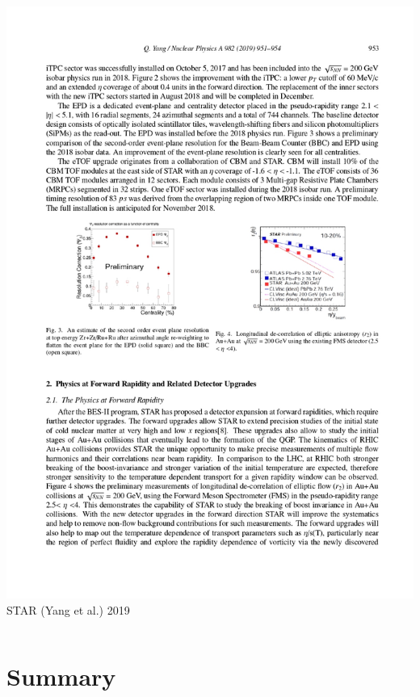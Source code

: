 \documentclass[accentcolor=tud2c,usenames,dvipsnames,colorbacktitle,inverttitle,landscape,german,presentation,t]{tudbeamer}
\begin{document}
\begin{frame}
\begin{columns}[c]
\begin{column}{0.4\textwidth}
\begin{center}
          \includegraphics[trim={2.4cm 11.4cm 8.5cm 8.5cm},clip,width=\textwidth]{figures/15/epd}
          \\\footnotesize{STAR (Yang et al.) 2019}
        \end{center}
      \end{column}
    \end{columns}
  \end{frame}

  \section{Summary}
\end{document}
